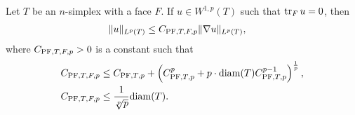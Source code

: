 \documentclass[10pt,letterpaper]{article}
\begin{document}
\begin{lemma}\label{lemma:mixedbconsimplex}
    Let $T$ be an $n$-simplex with a face $F$. 
    If $u \in W^{1,p}(T)$ such that $\operatorname{tr}_{F} u = 0$, then 
    \begin{align*}
        \| u \|_{L^{p}(T)}
        &
        \leq 
        C_{{\rm PF},T,F,p} \| \nabla u \|_{L^{p}(T)}
        ,
    \end{align*}
    where $C_{{\rm PF},T,F,p} > 0$ is a constant such that 
    \begin{align*}
        C_{{\rm PF},T,F,p}
        &\leq 
        C_{{\rm PF},T,p} + \left( C_{{\rm PF},T,p}^{p} + p \cdot {\operatorname{diam}}(T) C_{{\rm PF},T,p}^{p-1} \right)^{\frac 1 p},  
        \\
        C_{{\rm PF},T,F,p}
        &\leq
        \frac{1}{\sqrt[p]{p}}
        {\operatorname{diam}}(T)
        .
    \end{align*}
\end{lemma}
\end{document}
